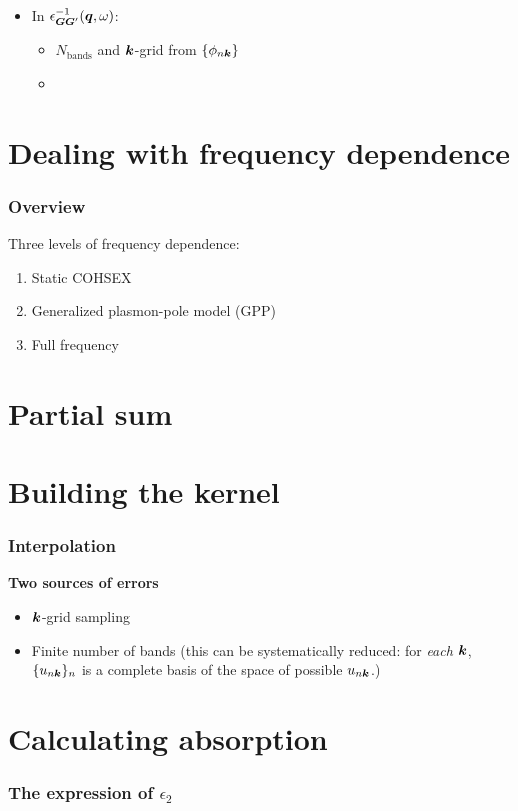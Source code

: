 \documentclass[t]{beamer}
\begin{document}
\begin{frame}[allowframebreaks]
\begin{itemize}
    \item In $\epsilon^{-1}_{\vb*{G} \vb*{G}'}(\vb*{q}, \omega)$:
    \begin{itemize}
        \item $N_{\text{bands}}$ and $\vb*{k}$-grid from $\{\phi_{n \vb*{k}}\}$
        \item  
    \end{itemize}
\end{itemize}

\end{frame}

\section{Dealing with frequency dependence}

\begin{frame}
\frametitle{Overview}

Three levels of frequency dependence:
\begin{enumerate}
    \item Static COHSEX 
    \item Generalized plasmon-pole model (GPP)
    \item Full frequency
\end{enumerate}    

\end{frame}

\section{Partial sum}

\section{Building the kernel}

\begin{frame}
\frametitle{Interpolation}

\textbf{Two sources of errors} \begin{itemize}
    \item $\vb*{k}$-grid sampling 
    \item Finite number of bands
    (this can be systematically reduced: 
    for \emph{each} $\vb*{k}$, 
    $\{u_{n \vb*{k}}\}_n$ is a complete basis of 
    the space of possible $u_{n \vb*{k}}$.)
\end{itemize}

\end{frame}

\section{Calculating absorption}

\begin{frame}
\frametitle{The expression of $\epsilon_2$}

    

\end{frame}
\end{document}

